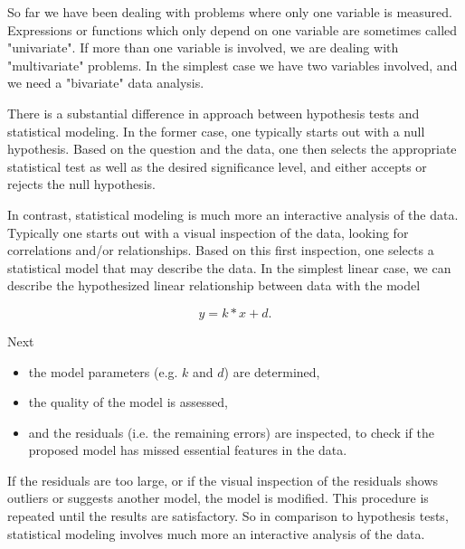 
So far we have been dealing with problems where only one variable is measured. Expressions or functions which only depend on one variable are sometimes called "univariate". If more than one variable is involved, we are dealing with "multivariate" problems. In the simplest case we have two variables involved, and we need a "bivariate" data analysis.

There is a substantial difference in approach between hypothesis tests and statistical modeling. In the former case, one typically starts out with a null hypothesis. Based on the question and the data, one then selects the appropriate statistical test as well as the desired significance level, and either accepts or rejects the null hypothesis.

In contrast, statistical modeling is much more an interactive analysis of the data. Typically one starts out with a visual inspection of the data, looking for correlations and/or relationships.
Based on this first inspection, one selects a statistical model that may describe the data. In the simplest linear case, we can describe the hypothesized linear relationship between data with the model

\begin{equation*}
  y = k*x + d .
\end{equation*}

Next
\begin{itemize}
  \item the model parameters (e.g. $k$ and $d$) are determined,
  \item the quality of the model is assessed,
  \item and the residuals (i.e. the remaining errors) are inspected, to check if the proposed model has missed essential features in the data.
\end{itemize}

If the residuals are too large, or if the visual inspection of the residuals shows outliers or suggests another model, the model is modified. This procedure is repeated until the results are satisfactory. So in comparison to hypothesis tests, statistical modeling involves much more an interactive analysis of the data.


